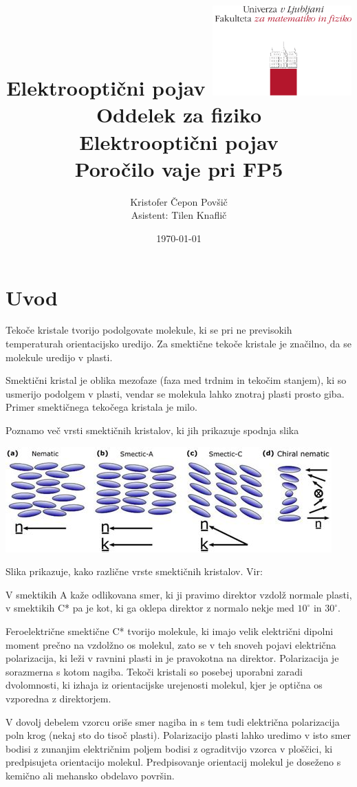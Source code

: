 \documentclass[11pt]{article}
\date{\today}
\title{Elektrooptični pojav}
\title{
  \includegraphics[width=0.4\textwidth]{fmf_logo}\\
  {\small Oddelek za fiziko} \\
  {Elektrooptični pojav}\\
  {\small Poročilo vaje pri FP5}\\

}
\date{}
\author{ Kristofer Čepon Povšič \\[5 cm]
  \small  Asistent: Tilen Knaflič  \\
}
\renewcommand{%
  \refname}{Viri}
\begin{document}
\maketitle
\pagebreak
\tableofcontents\pagebreak
\section{Uvod}\label{sec:org38a6132}

Tekoče kristale tvorijo podolgovate molekule, ki se pri ne previsokih temperaturah orientacijsko uredijo. Za smektične tekoče kristale je značilno, da se molekule uredijo v plasti.

Smektični kristal je oblika mezofaze (faza med trdnim in tekočim stanjem), ki so usmerijo podolgem v plasti, vendar se molekula lahko znotraj plasti prosto giba. Primer smektičnega tekočega kristala je milo.\cite{daken_smectic_2022}

Poznamo več vrsti smektičnih kristalov, ki jih prikazuje spodnja slika

\begin{slika}[H]
\begin{center}
\includegraphics[width=.9\linewidth]{smecticCrystals.jpg}
\end{center}
\caption{\small Slika prikazuje, kako različne vrste smektičnih kristalov. Vir:\cite{daken_smectic_2022} }
\end{slika}

V smektikih A kaže odlikovana smer, ki ji pravimo direktor vzdolž normale plasti, v smektikih C* pa je kot, ki ga oklepa direktor z normalo nekje med \(10^{\circ} \text{ in } 30^{\circ}\).

Feroelektrične smektične C* tvorijo molekule, ki imajo velik električni dipolni moment prečno na vzdolžno os molekul, zato se v teh snoveh pojavi električna polarizacija, ki leži v ravnini plasti in je pravokotna na direktor. Polarizacija je sorazmerna s kotom nagiba. Tekoči kristali so posebej uporabni zaradi dvolomnosti, ki izhaja iz orientacijske urejenosti molekul, kjer je optična os vzporedna z direktorjem.

V dovolj debelem vzorcu oriše smer nagiba in s tem tudi električna polarizacija poln krog (nekaj sto do tisoč plasti). Polarizacijo plasti lahko uredimo v isto smer bodisi z zunanjim električnim poljem bodisi z ograditvijo vzorca v ploščici, ki predpisujeta orientacijo molekul. Predpisovanje orientacij molekul je doseženo s kemično ali mehansko obdelavo površin.
\end{document}
